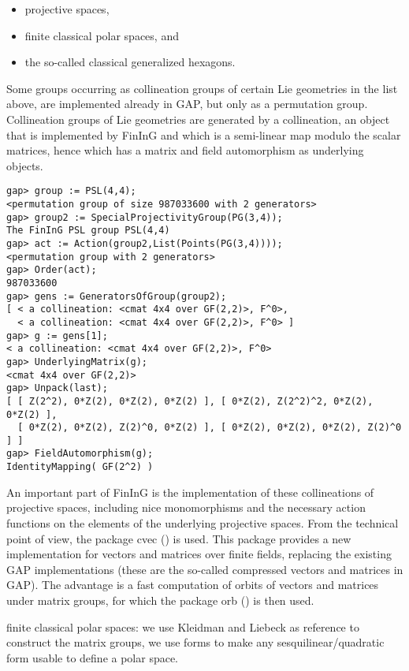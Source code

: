 \documentclass{article}
\def\fining{{\sf FinInG}}
\begin{document}
\begin{itemize}
\item projective spaces,
\item finite classical polar spaces, and
\item the so-called classical generalized hexagons.
\end{itemize}

Some groups occurring as collineation groups of certain Lie geometries in the list above, are implemented already in GAP, but only
as a permutation group. Collineation groups of Lie geometries are generated by a collineation, an object that is implemented by \fining{}
and which is a semi-linear map modulo the scalar matrices, hence which has a matrix and field automorphism as underlying
objects. 

\begin{verbatim}
gap> group := PSL(4,4);                          
<permutation group of size 987033600 with 2 generators>
gap> group2 := SpecialProjectivityGroup(PG(3,4));
The FinInG PSL group PSL(4,4)
gap> act := Action(group2,List(Points(PG(3,4))));
<permutation group with 2 generators>
gap> Order(act);
987033600
gap> gens := GeneratorsOfGroup(group2);
[ < a collineation: <cmat 4x4 over GF(2,2)>, F^0>, 
  < a collineation: <cmat 4x4 over GF(2,2)>, F^0> ]
gap> g := gens[1];
< a collineation: <cmat 4x4 over GF(2,2)>, F^0>
gap> UnderlyingMatrix(g);
<cmat 4x4 over GF(2,2)>
gap> Unpack(last);
[ [ Z(2^2), 0*Z(2), 0*Z(2), 0*Z(2) ], [ 0*Z(2), Z(2^2)^2, 0*Z(2), 0*Z(2) ], 
  [ 0*Z(2), 0*Z(2), Z(2)^0, 0*Z(2) ], [ 0*Z(2), 0*Z(2), 0*Z(2), Z(2)^0 ] ]
gap> FieldAutomorphism(g);
IdentityMapping( GF(2^2) )
\end{verbatim} 

An important part of \fining{} is the implementation of these collineations of projective spaces, including nice monomorphisms
and the necessary action functions on the elements of the underlying projective spaces. From the technical point of view, 
the package cvec (\cite{cvec}) is used. This package provides a new implementation for vectors and matrices over finite 
fields, replacing the existing GAP implementations (these are the so-called compressed vectors and matrices in GAP). The advantage
is a fast computation of orbits of vectors and matrices under matrix groups, for which the package orb (\cite{orb}) is then used.


finite classical polar spaces: we use Kleidman and Liebeck as reference to construct the matrix groups, we use forms to make 
any sesquilinear/quadratic form usable to define a polar space. 
\end{document}
